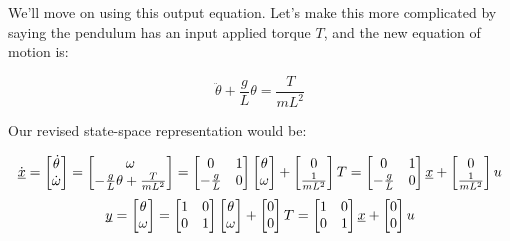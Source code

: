 \documentclass{report}
\begin{document}
\begin{onehalfspacing}
\begin{flushleft}
We'll move on using this output equation. Let's make this more complicated by saying the pendulum has an input applied torque \(T\), and the new equation of motion is:

\vspace{-0.1in}
\[\ddot{\theta} + \frac{g}{L} \theta = \frac{T}{mL^2}\]

Our revised state-space representation would be:

\vspace{-0.1in}
\[\dot{\underbar{\(x\)}} = \begin{bmatrix}
    \dot{\theta} \\
    \dot{\omega}  \end{bmatrix} = \begin{bmatrix}
    \omega \\
    -\frac{g}{L} \theta + \frac{T}{mL^2}
\end{bmatrix} = \begin{bmatrix}
    0 & 1\\
    -\frac{g}{L} & 0
\end{bmatrix} \begin{bmatrix}
    \theta \\
    \omega  \end{bmatrix} + \begin{bmatrix}
        0 \\
        \frac{1}{mL^2}  \end{bmatrix} T = \begin{bmatrix}
            0 & 1\\
            -\frac{g}{L} & 0
        \end{bmatrix} \underbar{\(x\)} + \begin{bmatrix}
                0 \\
                \frac{1}{mL^2}  \end{bmatrix} u\]
\[\underbar{\(y\)} = \begin{bmatrix}
    \theta \\
    \omega  \end{bmatrix} = \begin{bmatrix}
        1 & 0\\
        0 & 1
    \end{bmatrix} \begin{bmatrix}
        \theta \\
        \omega  \end{bmatrix} + \begin{bmatrix}
            0 \\
            0  \end{bmatrix} T = \begin{bmatrix}
                1 & 0\\
                0 & 1
            \end{bmatrix} \underbar{\(x\)} + \begin{bmatrix}
                    0 \\
                    0  \end{bmatrix} u\]


\end{flushleft}
\end{onehalfspacing}
\end{document}
